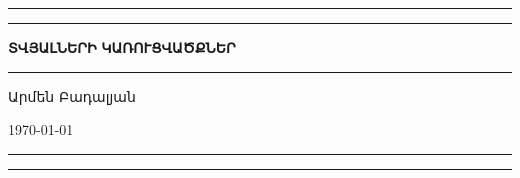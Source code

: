 
\begin{titlepage}
\begingroup
\newlength\drop{}\textheight

\setlength{\parindent}{0pt}

\rule{\textwidth}{1pt}\par
\vspace{2pt}\vspace{-\baselineskip}
\rule{\textwidth}{0.4pt}\par

\vspace\drop
\centering

{\fontsize{42}{42}\selectfont\textbf{ՏՎՅԱԼՆԵՐԻ}}
\null\vskip12pt\null
{\fontsize{32}{32}\selectfont\textbf{ԿԱՌՈՒՑՎԱԾՔՆԵՐ}}

\vspace{0.25\drop}
\rule{0.3\textwidth}{0.4pt}\par
\vspace{\drop}

{\LARGE Արմեն Բադալյան}\par

\vfill

{\large\today}

\rule{\textwidth}{0.4pt}\par
\vspace{2pt}\vspace{-\baselineskip}
\rule{\textwidth}{1pt}\par

\endgroup

\end{titlepage}

\begin{titlepage}
\null
\end{titlepage}
